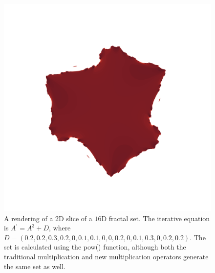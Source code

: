 \documentclass[12pt]{article}
\begin{document}
\begin{figure} 
\centering
  \includegraphics[width = 6 in]{16d_pow3.png}
  \caption{A rendering of a $2$D slice of a $16$D fractal set.
The iterative equation is $A^{\prime} = A^3 + D$, where $D = (0.2, 0.2, 0.3, 0.2, 0, 0.1, 0.1, 0, 0, 0.2, 0, 0.1, 0.3, 0, 0.2, 0.2)$.
The set is calculated using the pow() function, although both the traditional multiplication and new multiplication operators generate the same set as well.
}
\end{figure}
\end{document}
